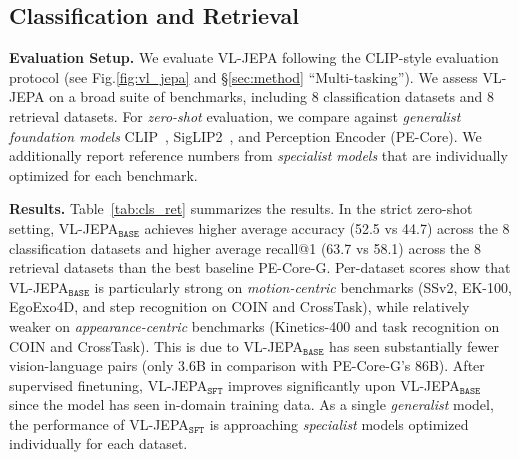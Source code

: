 \subsection{Classification and Retrieval}
\label{sec:exp.cls_ret}

\textbf{Evaluation Setup.}  We evaluate VL-JEPA following the CLIP-style evaluation protocol (see Fig.\ref{fig:vl_jepa} and \S\ref{sec:method} ``Multi-tasking''). We assess VL-JEPA on a broad suite of benchmarks, including 8 classification datasets and 8 retrieval datasets. For \textit{zero-shot} evaluation, we compare against \textit{generalist foundation models} CLIP~\citep{radford2021learning}, SigLIP2~\citep{tschannen2025siglip}, and Perception Encoder (PE-Core)\citep{bolya2025perception}. We additionally report reference numbers from \textit{specialist models} that are individually optimized for each benchmark.


\textbf{Results.} Table~\ref{tab:cls_ret} summarizes the results. In the strict zero-shot setting, VL-JEPA$_\texttt{BASE}$ achieves higher average accuracy (52.5 vs 44.7) across the 8 classification datasets and higher average recall@1 (63.7 vs 58.1) across the 8 retrieval datasets than the best baseline PE-Core-G. Per-dataset scores show that VL-JEPA$_\texttt{BASE}$ is {particularly strong on \textit{motion-centric} benchmarks (SSv2, EK-100, EgoExo4D, and step recognition on COIN and CrossTask), while relatively weaker on \textit{appearance-centric} benchmarks (Kinetics-400 and task recognition on COIN and CrossTask)}. This is due to VL-JEPA$_\texttt{BASE}$ has seen substantially fewer vision-language pairs (only 3.6B in comparison with PE-Core-G's 86B). After supervised finetuning, VL-JEPA$_\texttt{SFT}$ improves significantly upon VL-JEPA$_\texttt{BASE}$ since the model has seen in-domain training data. As a single \textit{generalist} model, the performance of VL-JEPA$_\texttt{SFT}$ is approaching \textit{specialist} models optimized individually for each dataset.


